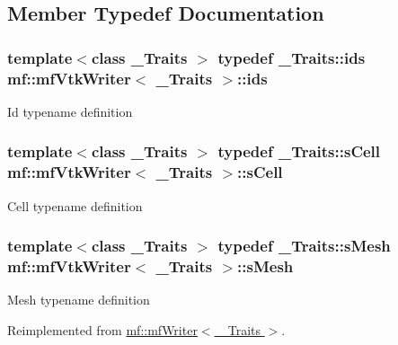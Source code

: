 \subsection{Member Typedef Documentation}
\hypertarget{classmf_1_1mfVtkWriter_af3a5d3d8c256dfd6eb0556c1591d078f}{
\subsubsection[{ids}]{\setlength{\rightskip}{0pt plus 5cm}template$<$class \_\-Traits $>$ typedef \_\-Traits::ids {\bf mf::mfVtkWriter}$<$ \_\-Traits $>$::{\bf ids}}}
\label{classmf_1_1mfVtkWriter_af3a5d3d8c256dfd6eb0556c1591d078f}
Id typename definition \hypertarget{classmf_1_1mfVtkWriter_aa06d44e52fcb4460ee77862f62bffd42}{
\subsubsection[{sCell}]{\setlength{\rightskip}{0pt plus 5cm}template$<$class \_\-Traits $>$ typedef \_\-Traits::sCell {\bf mf::mfVtkWriter}$<$ \_\-Traits $>$::{\bf sCell}}}
\label{classmf_1_1mfVtkWriter_aa06d44e52fcb4460ee77862f62bffd42}
Cell typename definition \hypertarget{classmf_1_1mfVtkWriter_a0627a25b5da983842978040d92539e9e}{
\subsubsection[{sMesh}]{\setlength{\rightskip}{0pt plus 5cm}template$<$class \_\-Traits $>$ typedef \_\-Traits::sMesh {\bf mf::mfVtkWriter}$<$ \_\-Traits $>$::{\bf sMesh}}}
\label{classmf_1_1mfVtkWriter_a0627a25b5da983842978040d92539e9e}
Mesh typename definition 

Reimplemented from \hyperlink{classmf_1_1mfWriter}{mf::mfWriter$<$ \_\-Traits $>$}.

